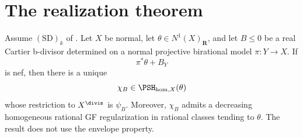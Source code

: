 \section{The realization theorem}
\label{sec:ch38-realization}

\begin{theorem}\label{thm:bj-real-cartier-realization}
Assume $\mathrm{(SD)}_k$ of .
Let $X$ be normal, let $\theta\in N^1(X)_{\mathbf R}$, and let
$B\le0$ be a real Cartier b-divisor determined on a normal projective
birational model $\pi:Y\to X$.  If
\[
                         \pi^*\theta+B_Y
\tag{38.34}\label{eq:bj-realization-nef-hypothesis}
\]
is nef, then there is a unique
\[
                     \chi_B\in\PSH_{\mathrm{hom},X}(\theta)
\]
whose restriction to $X^{\divis}$ is $\psi_B$.  Moreover,
$\chi_B$ admits a decreasing homogeneous rational GF regularization in
rational classes tending to $\theta$.  The result does not use the
envelope property.
\end{theorem}

